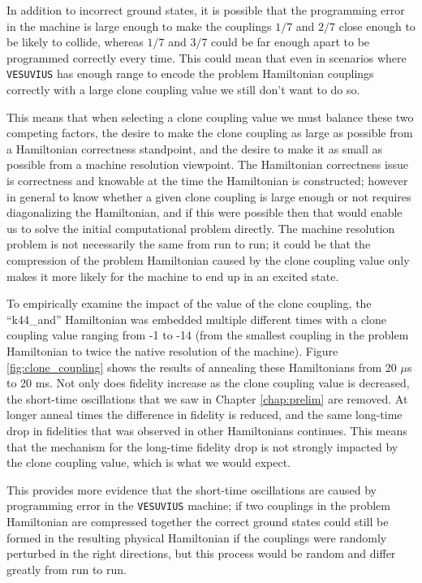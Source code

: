 In addition to incorrect ground states, it is possible that the programming error in the machine is large enough to make the couplings $1/7$ and $2/7$ close enough to be likely to collide, whereas $1/7$ and $3/7$ could be far enough apart to be programmed correctly every time.  This could mean that even in scenarios where \texttt{VESUVIUS} has enough range to encode the problem Hamiltonian couplings correctly with a large clone coupling value we still don't want to do so.

This means that when selecting a clone coupling value we must balance these two competing factors, the desire to make the clone coupling as large as possible from a Hamiltonian correctness standpoint, and the desire to make it as small as possible from a machine resolution viewpoint.  The Hamiltonian correctness issue is correctness and knowable at the time the Hamiltonian is constructed; however in general to know whether a given clone coupling is large enough or not requires diagonalizing the Hamiltonian, and if this were possible then that would enable us to solve the initial computational problem directly.
The machine resolution problem is not necessarily the same from run to run; it could be that the compression of the problem Hamiltonian caused by the clone coupling value only makes it more likely for the machine to end up in an excited state.

To empirically examine the impact of the value of the clone coupling, the ``k44\_and'' Hamiltonian was embedded multiple different times with a clone coupling value ranging from -1 to -14 (from the smallest coupling in the problem Hamiltonian to twice the native resolution of the machine).  Figure \ref{fig:clone_coupling} shows the results of annealing these Hamiltonians from 20 $\mu$s to 20 ms.  Not only does fidelity increase as the clone coupling value is decreased, the short-time oscillations that we saw in Chapter \ref{chap:prelim} are removed.  At longer anneal times the difference in fidelity is reduced, and the same long-time drop in fidelities that was observed in other Hamiltonians continues.  This means that the mechanism for the long-time fidelity drop is not strongly impacted by the clone coupling value, which is what we would expect.

This provides more evidence that the short-time oscillations are caused by programming error in the \texttt{VESUVIUS} machine; if two couplings in the problem Hamiltonian are compressed together the correct ground states could still be formed in the resulting physical Hamiltonian if the couplings were randomly perturbed in the right directions, but this process would be random and differ greatly from run to run.

